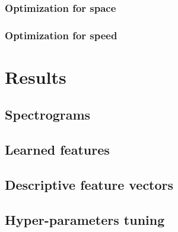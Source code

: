 \documentclass[a4paper,12pt,twoside]{report}
\begin{document}
\subsection{Optimization for space}

\subsection{Optimization for speed}

\chapter{Results}
\label{results}

\section{Spectrograms}

\section{Learned features}

\section{Descriptive feature vectors}

\section{Hyper-parameters tuning}
\end{document}
